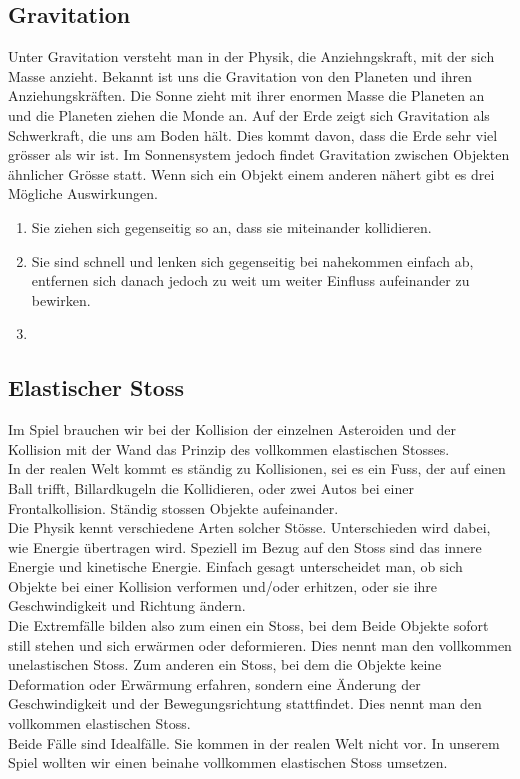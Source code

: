 \documentclass[12pt,a4paper]{scrartcl}
\begin{document}
\subsection{Gravitation}
Unter Gravitation versteht man in der Physik, die Anziehngskraft, mit der sich Masse anzieht.
Bekannt ist uns die Gravitation von den Planeten und ihren Anziehungskräften.
Die Sonne zieht mit ihrer enormen Masse die Planeten an und die Planeten ziehen die Monde an.
Auf der Erde zeigt sich Gravitation als Schwerkraft, die uns am Boden hält.
Dies kommt davon, dass die Erde sehr viel grösser als wir ist.
Im Sonnensystem jedoch findet Gravitation zwischen Objekten ähnlicher Grösse statt.
Wenn sich ein Objekt einem anderen nähert gibt es drei Mögliche Auswirkungen.
\begin{enumerate}
\item Sie ziehen sich gegenseitig so an, dass sie miteinander kollidieren.
\item Sie sind schnell und lenken sich gegenseitig bei nahekommen einfach ab, entfernen sich danach jedoch zu weit um weiter Einfluss aufeinander zu bewirken.
\item 

\end{enumerate}


\subsection{Elastischer Stoss}
Im Spiel brauchen wir bei der Kollision der einzelnen Asteroiden und der Kollision mit der Wand das Prinzip des vollkommen elastischen Stosses. \\
In der realen Welt kommt es ständig zu Kollisionen, sei es ein Fuss, der auf einen Ball trifft, Billardkugeln die Kollidieren, oder zwei Autos bei einer Frontalkollision. 
Ständig stossen Objekte aufeinander. \\
Die Physik kennt verschiedene Arten solcher Stösse.
Unterschieden wird dabei, wie Energie übertragen wird.
Speziell im Bezug auf den Stoss sind das innere Energie und kinetische Energie.
Einfach gesagt unterscheidet man, ob sich Objekte bei einer Kollision verformen und/oder erhitzen, oder sie ihre Geschwindigkeit und Richtung ändern.\\
Die Extremfälle bilden also zum einen ein Stoss, bei dem Beide Objekte sofort still stehen und sich erwärmen oder deformieren.
Dies nennt man den vollkommen unelastischen Stoss.
Zum anderen ein Stoss, bei dem die Objekte keine Deformation oder Erwärmung erfahren, sondern eine Änderung der Geschwindigkeit und der Bewegungsrichtung stattfindet.
Dies nennt man den vollkommen elastischen Stoss.\\
Beide Fälle sind Idealfälle.
Sie kommen in der realen Welt nicht vor.
In unserem Spiel wollten wir einen beinahe vollkommen elastischen Stoss umsetzen.
\end{document}
